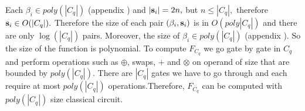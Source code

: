 Each $\beta_i \in poly(|C_q|)$ (appendix ) and $|{\bf s}_i|=2n,$ but $n\leq |C_q|,$ therefore ${\bf s}_i \in O(|C_q|).$  Therefore the size of each pair $(\beta_i, {\bf s}_i)$ is in $O(poly|C_q|)$ and there are only $\log(|C_q|)$ pairs.
 Moreover,  the size of $\beta_i \in poly(|C_q|)$ (appendix ). So the size of the function is polynomial. To compute $F_{C_q}$ we go gate by gate in $C_q$ and perform operations such as $\oplus$, swaps, $+$ and $\otimes$ on operand of size that are bounded by $poly(|C_q|).$ There are $|C_q|$ gates we have to go through and each require at most $poly(|C_q|)$ 
operations.Therefore, $F_{C_q}$ can be computed with $poly(|C_q|)$ size classical circuit. 












